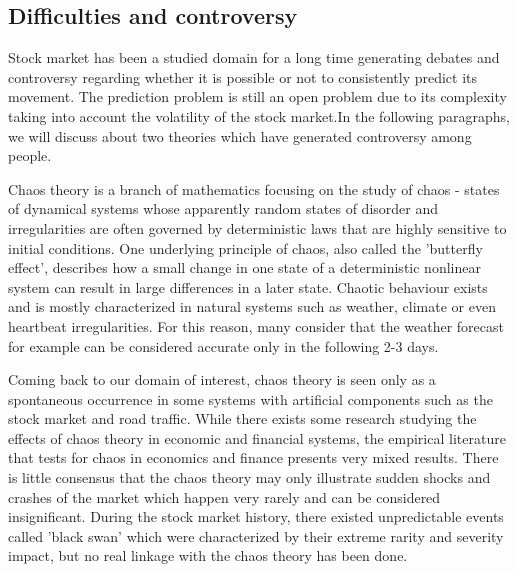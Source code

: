 \subsection{Difficulties and controversy}
Stock market has been a studied domain for a long time generating debates and controversy regarding whether it is possible or not to consistently predict its movement. The prediction problem is still an open problem due to its complexity taking into account the volatility of the stock market.In the following paragraphs, we will discuss about two theories which have generated controversy among people.

\vspace{5mm}

Chaos theory is a branch of mathematics focusing on the study of chaos - states of dynamical systems whose apparently random states of disorder and irregularities are often governed by deterministic laws that are highly sensitive to initial conditions. One underlying principle of chaos, also called the 'butterfly effect', describes how a small change in one state of a deterministic nonlinear system can result in large differences in a later state. Chaotic behaviour exists and is mostly characterized in natural systems such as weather, climate or even heartbeat irregularities. For this reason, many consider that the weather forecast for example can be considered accurate only in the following 2-3 days.

Coming back to our domain of interest, chaos theory is seen only as a spontaneous occurrence in some systems with artificial components such as the stock market and road traffic. While there exists some research studying the effects of chaos theory in economic and financial systems, the empirical literature that tests for chaos in economics and finance presents very mixed results.\cite{brooks1998chaos} There is little consensus that the chaos theory may only illustrate sudden shocks and crashes of the market which happen very rarely and can be considered insignificant. During the stock market history, there existed unpredictable events called 'black swan' which were characterized by their extreme rarity and severity impact, but no real linkage with the chaos theory has been done.

\vspace{5mm}

